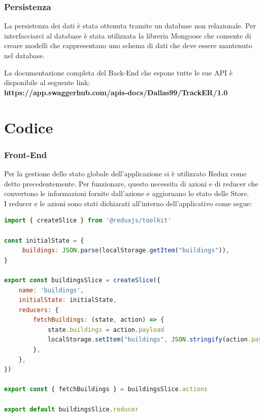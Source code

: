 \documentclass{report}
\begin{document}
\subsection{Persistenza}
La persistenza dei dati è stata ottenuta tramite un database non relazionale. Per interfacciarci al database è stata utilizzata la libreria Mongoose che consente di creare modelli che rappresentano uno schema di dati che deve essere mantenuto nel database. 

 \par La documentazione completa del Back-End che espone tutte le sue API è disponibile al seguente link: \\ \textbf{https://app.swaggerhub.com/apis-docs/Dallas99/TrackER/1.0}

\chapter{Codice}
\subsection {Front-End}
Per la gestione dello stato globale dell'applicazione si è utilizzato Redux come detto precedentemente.
Per funzionare, questo necessita di azioni e di reducer che convertono le informazioni fornite dall’azione e aggiornano lo stato delle Store.
\\I reducer e le azioni sono stati dichiarati all'interno dell'applicativo come segue:

\begin{lstlisting}[language=JavaScript]
import { createSlice } from '@reduxjs/toolkit'

const initialState = {
     buildings: JSON.parse(localStorage.getItem("buildings")),
}

export const buildingsSlice = createSlice({
    name: 'buildings',
    initialState: initialState,
    reducers: {
        fetchBuildings: (state, action) => {
            state.buildings = action.payload
            localStorage.setItem("buildings", JSON.stringify(action.payload))
        },
    },
})

export const { fetchBuildings } = buildingsSlice.actions

export default buildingsSlice.reducer
\end{lstlisting}
\end{document}
